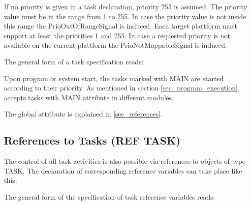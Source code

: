 


If no priority is given in a task declaration, priority 255 is assumed.
The priority value must be in the range from 1 to 255. 
In case the priority value is not inside this range the PrioOutOfRangeSignal
is induced.
Each target plattform must support at least the priorities 1 and 255.
In case a requested priority is not avaliable on the current plattform
the PrioNotMappableSignal is induced.


The general form of a task specification reads:




Upon program or system start, the tasks marked with MAIN are started
according to their priority. 
As mentioned in section \ref{sec_program_execution}, \OpenPEARL{} 
accepts tasks with MAIN attribute in different modules.

The global attribute is explained in \ref{sec_references}.

\subsection{References to Tasks (REF TASK)}   %
\label{sec_ref_task}

The control of all task activities is also possible via references to
objects of type TASK. The declaration of corresponding reference
variables can take place like this:



The general form of the specification of task reference variables reads:



